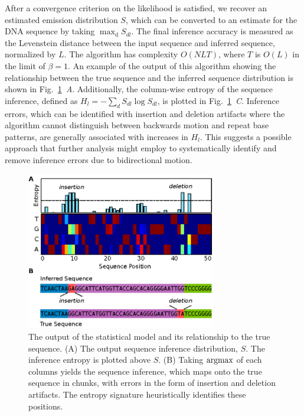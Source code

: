 \documentclass{biophys_letter}
\newcommand{\argmax}{\operatornamewithlimits{argmax}}
\newcommand{\bias}{\beta}
\newcommand{\kje}[1]{\textcolor{BurntOrange}{#1}}
\begin{document}
After a convergence criterion on the likelihood is satisfied, we recover an estimated emission distribution $S$, which can be converted to an estimate for the DNA sequence by taking $\mathrm{\max_{d}} {S_{dl}}$.
The final inference accuracy is measured as the Levenstein distance between the input sequence and inferred sequence, normalized by $L$.
The algorithm has complexity $O(NLT)$, where $T$ is $O(L)$ in the limit of $\bias=1$.
An example of the output of this algorithm showing the relationship between the true sequence and the inferred sequence distribution is shown in Fig.~\ref{fig:inference_output}\emph{~A}.
Additionally, the column-wise entropy of the sequence inference, defined as $H_{l}=-\sum_{d}S_{dl}\log{S_{dl}}$, is plotted in Fig.~\ref{fig:inference_output}\emph{~C}.
\kje{Inference errors, which can be identified with insertion and deletion artifacts where the algorithm cannot distinguish between backwards motion and repeat base patterns, are generally associated with increases in $H_{l}$.}
\kje{This suggests a possible approach that further analysis might employ to systematically identify and remove inference errors due to bidirectional motion.}

\begin{figure}
  \centering
  \includegraphics[width=3.25in]{fig/stochseq-fig2.eps}
  \caption{The output of the statistical model and its relationship to the true sequence. (A) The output sequence inference distribution, $S$. The inference entropy is plotted above $S$. (B) Taking $\argmax$ of each columns yields the sequence inference, which maps onto the true sequence in chunks, with errors in the form of insertion and deletion artifacts. The entropy signature heuristically identifies these positions.}
  \label{fig:inference_output}
\end{figure}
\end{document}
